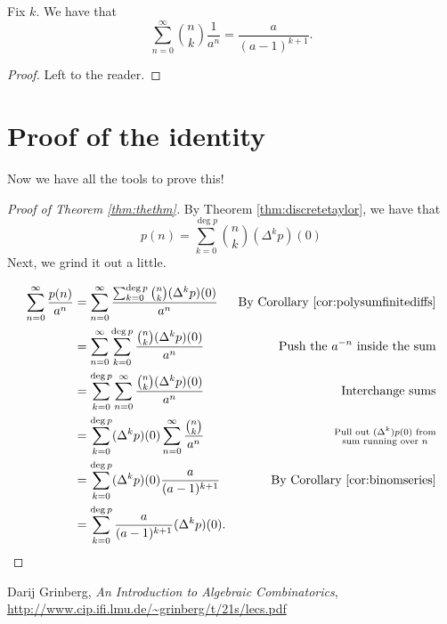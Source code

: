\documentclass{article}
\DeclareMathOperator{\degree}{deg}
\begin{document}
\begin{corollary}\label{cor:binomseries}
    Fix $k$.
    We have that
    \[
        \sum_{n=0}^\infty \binom{n}{k} \frac{1}{a^n} = \frac{a}{(a-1)^{k+1}}.
    \]
\end{corollary}

\begin{proof}
    Left to the reader.
\end{proof}

\section{Proof of the identity}

Now we have all the tools to prove this!

\begin{proof}[Proof of Theorem \ref{thm:thethm}]
    By Theorem \ref{thm:discretetaylor}, we have that
    \[
        p(n) = \sum_{k=0}^{\degree p}\binom{n}{k}(\Delta^k p)(0)
    \]
    Next, we grind it out a little.

    \begin{align*}
        \sum_{n=0}^\infty \frac{p(n)}{a^n} &= \sum_{n=0}^\infty \frac{\sum_{k=0}^{\degree p}\binom{n}{k}(\Delta^k p)(0)}{a^n}  & \text{By Corollary \ref{cor:polysumfinitediffs}} \\
                                           &= \sum_{n=0}^\infty \sum_{k=0}^{\degree p} \frac{\binom{n}{k}(\Delta^k p)(0)}{a^n} & \text{Push the }a^{-n}\text{ inside the sum} \\
                                           &= \sum_{k=0}^{\degree p} \sum_{n=0}^\infty \frac{\binom{n}{k}(\Delta^k p)(0)}{a^n} & \text{Interchange sums} \\
                                           &= \sum_{k=0}^{\degree p} (\Delta^k p)(0) \sum_{n=0}^\infty \frac{\binom{n}{k}}{a^n} & \substack{\text{Pull out }(\Delta^k)p(0)\text{ from}\\ \text{sum running over }n}\\
                                           &= \sum_{k=0}^{\degree p} (\Delta^k p)(0) \frac{a}{(a-1)^{k+1}} & \text{By Corollary \ref{cor:binomseries}} \\
                                           &= \sum_{k=0}^{\degree p} \frac{a}{(a-1)^{k+1}} (\Delta^k p)(0).
    \end{align*}
\end{proof}



\begin{thebibliography}{999999}
    \footnotesize\raggedright

    Darij Grinberg, \textit{An Introduction to Algebraic Combinatorics}, \url{http://www.cip.ifi.lmu.de/~grinberg/t/21s/lecs.pdf}

\end{thebibliography}
\end{document}
